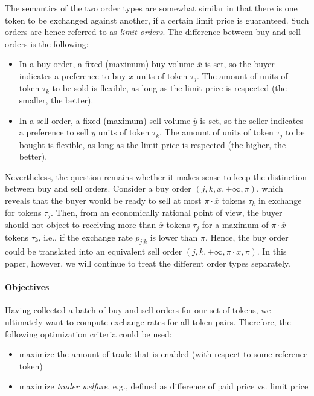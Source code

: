 \documentclass[11pt,parskip=full]{scrartcl}%
\newcommand*{\ie}{i.e., }
\newcommand*{\eg}{e.g., }
\newcommand*{\wrt}{with respect to }
\begin{document}
\newpage
The semantics of the two order types are somewhat similar in that there is one token to be
exchanged against another, if a certain limit price is guaranteed.
Such orders are hence referred to as \emph{limit orders}.
The difference between buy and sell orders is the following:
\begin{itemize}
  \item In a buy order, a fixed (maximum) buy volume $ \overline{x} $ is set, so the buyer
  indicates a preference to buy $ \overline{x} $ units of token $ \tau_j $.
  The amount of units of token $ \tau_k $ to be sold is flexible, as long as the limit price is
  respected (the smaller, the better).
  \item In a sell order, a fixed (maximum) sell volume $ \overline{y} $ is set, so the seller
  indicates a preference to sell $ \overline{y} $ units of token $ \tau_k $.
  The amount of units of token $ \tau_j $ to be bought is flexible, as long as the limit price
  is respected (the higher, the better).
\end{itemize}
\vspace{.3cm}

Nevertheless, the question remains whether it makes sense to keep the distinction between buy and
sell orders.
Consider a buy order $ (j,k,\overline{x},+\infty,\pi) $, which reveals that the buyer would be
ready to sell at most $ \pi \cdot \overline{x} $ tokens $ \tau_k $ in exchange for tokens
$ \tau_j $.
Then, from an economically rational point of view, the buyer should not object to receiving more
than $ \overline{x} $ tokens $ \tau_j $ for a maximum of $ \pi \cdot \overline{x} $ tokens
$ \tau_k $, \ie if the exchange rate $ p_{j|k} $ is lower than $ \pi $.
Hence, the buy order could be translated into an equivalent sell order
$ (j,k,+\infty,\pi \cdot \overline{x},\pi) $.
In this paper, however, we will continue to treat the different order types separately.


\paragraph{Objectives}

Having collected a batch of buy and sell orders for our set of tokens, we ultimately want to
compute exchange rates for all token pairs.
Therefore, the following optimization criteria could be used:
\begin{itemize}
  \item maximize the amount of trade that is enabled (\wrt some reference token)
  \item maximize \emph{trader welfare}, \eg defined as difference of paid price vs. limit price
\end{itemize}
\end{document}
